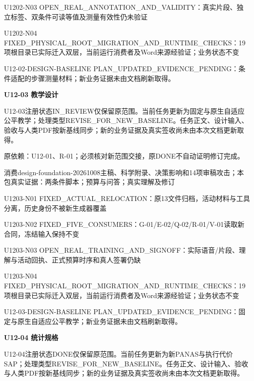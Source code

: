 \documentclass[11pt,a4paper]{article}
\newcommand{\reviewsection}[1]{\par\Needspace{5\baselineskip}\vspace{10pt}\begin{center}{\titlelatin\titlecjk\bfseries\fontsize{14}{20}\selectfont #1}\end{center}}
\begin{document}
U1202-\allowbreak{}N03 OPEN\_\allowbreak{}REAL\_\allowbreak{}ANNOTATION\_\allowbreak{}AND\_\allowbreak{}VALIDITY：真实片段、独立标签、双条件可读等值及测量有效性仍未验证


U1202-\allowbreak{}N04 FIXED\_\allowbreak{}PHYSICAL\_\allowbreak{}ROOT\_\allowbreak{}MIGRATION\_\allowbreak{}AND\_\allowbreak{}RUNTIME\_\allowbreak{}CHECKS：19项根目录已实际迁入双层，当前运行消费者及Word来源经验证；业务状态不变


U12-\allowbreak{}02-\allowbreak{}DESIGN-\allowbreak{}BASELINE PLAN\_\allowbreak{}UPDATED\_\allowbreak{}EVIDENCE\_\allowbreak{}PENDING：条件适配的步骤测量材料；新业务证据未由文档刷新取得。


\reviewsection{U12-\allowbreak{}03 教学设计}
U12-\allowbreak{}03注册状态IN\_\allowbreak{}REVIEW仅保留原范围。当前任务更新为固定与原生自适应公平教学；处理类型REVISE\_\allowbreak{}FOR\_\allowbreak{}NEW\_\allowbreak{}BASELINE。任务正文、设计输入、验收与人类PDF按新基线同步；新的业务证据及真实签收尚未由本次文档更新取得。


原依赖：U12-\allowbreak{}01、R-\allowbreak{}01；必须核对新范围交接，原DONE不自动证明修订完成。


消费design-\allowbreak{}foundation-\allowbreak{}20261008主稿、科学附录、决策影响和14项审稿攻击；本包真实证据：两条件脚本；预算与问答；真实理解及修订


U1203-\allowbreak{}N01 FIXED\_\allowbreak{}ACTUAL\_\allowbreak{}RELOCATION：原13文件归档，活动材料与工具分离，历史身份不被新生成器覆盖


U1203-\allowbreak{}N02 FIXED\_\allowbreak{}FIVE\_\allowbreak{}CONSUMERS：G-\allowbreak{}01/\allowbreak{}E-\allowbreak{}02/\allowbreak{}Q-\allowbreak{}02/\allowbreak{}R-\allowbreak{}01/\allowbreak{}V-\allowbreak{}01读取新合同，冻结输入保持不变


U1203-\allowbreak{}N03 OPEN\_\allowbreak{}REAL\_\allowbreak{}TRAINING\_\allowbreak{}AND\_\allowbreak{}SIGNOFF：实际语音/\allowbreak{}片段、理解与活动回执、正式预算时序和真人签署仍缺


U1203-\allowbreak{}N04 FIXED\_\allowbreak{}PHYSICAL\_\allowbreak{}ROOT\_\allowbreak{}MIGRATION\_\allowbreak{}AND\_\allowbreak{}RUNTIME\_\allowbreak{}CHECKS：19项根目录已实际迁入双层，当前运行消费者及Word来源经验证；业务状态不变


U12-\allowbreak{}03-\allowbreak{}DESIGN-\allowbreak{}BASELINE PLAN\_\allowbreak{}UPDATED\_\allowbreak{}EVIDENCE\_\allowbreak{}PENDING：固定与原生自适应公平教学；新业务证据未由文档刷新取得。


\reviewsection{U12-\allowbreak{}04 统计规格}
U12-\allowbreak{}04注册状态DONE仅保留原范围。当前任务更新为新PANAS与执行代价SAP；处理类型REVISE\_\allowbreak{}FOR\_\allowbreak{}NEW\_\allowbreak{}BASELINE。任务正文、设计输入、验收与人类PDF按新基线同步；新的业务证据及真实签收尚未由本次文档更新取得。
\end{document}
